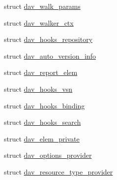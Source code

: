 \begin{DoxyCompactItemize}
\item 
struct \hyperlink{structdav__walk__params}{dav\+\_\+walk\+\_\+params}
\item 
struct \hyperlink{structdav__walker__ctx}{dav\+\_\+walker\+\_\+ctx}
\item 
struct \hyperlink{structdav__hooks__repository}{dav\+\_\+hooks\+\_\+repository}
\item 
struct \hyperlink{structdav__auto__version__info}{dav\+\_\+auto\+\_\+version\+\_\+info}
\item 
struct \hyperlink{structdav__report__elem}{dav\+\_\+report\+\_\+elem}
\item 
struct \hyperlink{structdav__hooks__vsn}{dav\+\_\+hooks\+\_\+vsn}
\item 
struct \hyperlink{structdav__hooks__binding}{dav\+\_\+hooks\+\_\+binding}
\item 
struct \hyperlink{structdav__hooks__search}{dav\+\_\+hooks\+\_\+search}
\item 
struct \hyperlink{structdav__elem__private}{dav\+\_\+elem\+\_\+private}
\item 
struct \hyperlink{structdav__options__provider}{dav\+\_\+options\+\_\+provider}
\item 
struct \hyperlink{structdav__resource__type__provider}{dav\+\_\+resource\+\_\+type\+\_\+provider}
\end{DoxyCompactItemize}

